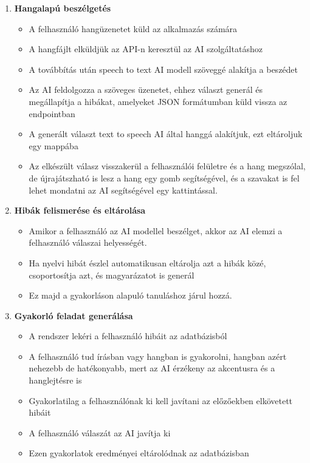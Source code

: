 \begin{enumerate}
    \item \textbf{Hangalapú beszélgetés}
    \begin{itemize}
        \item A felhasználó hangüzenetet küld az alkalmazás számára
        \item A hangfájlt elküldjük az API-n keresztül az AI szolgáltatáshoz
        \item A továbbítás után speech to text AI modell szöveggé alakítja a beszédet
        \item Az AI feldolgozza a szöveges üzenetet, ehhez választ generál és megállapítja a hibákat, amelyeket JSON formátumban küld vissza az endpointban
        \item A generált választ text to speech AI által hanggá alakítjuk, ezt eltároljuk egy mappába
        \item Az elkészült válasz visszakerül a felhasználói felületre és a hang megszólal, de újrajátszható is lesz a hang egy gomb segítségével, és a szavakat is fel lehet mondatni az AI segítségével egy kattintással.
    \end{itemize}
    \item \textbf{Hibák felismerése és eltárolása}
    \begin{itemize}
        \item Amikor a felhasználó az AI modellel beszélget, akkor az AI elemzi a felhasználó válaszai helyességét.
        \item Ha nyelvi hibát észlel automatikusan eltárolja azt a hibák közé, csoportosítja azt, és magyarázatot is generál
        \item Ez majd a gyakorláson alapuló tanuláshoz járul hozzá.
    \end{itemize}
    \item \textbf{Gyakorló feladat generálása}
    \begin{itemize}
        \item A rendszer lekéri a felhasználó hibáit az adatbázisból
        \item A felhasználó tud írásban vagy hangban is gyakorolni, hangban azért nehezebb de hatékonyabb, mert az AI érzékeny az akcentusra és a hanglejtésre is
        \item Gyakorlatilag a felhasználónak ki kell javítani az előzőekben elkövetett hibáit
        \item A felhasználó válaszát az AI javítja ki
        \item Ezen gyakorlatok eredményei eltárolódnak az adatbázisban

\end{itemize}
\end{enumerate}
